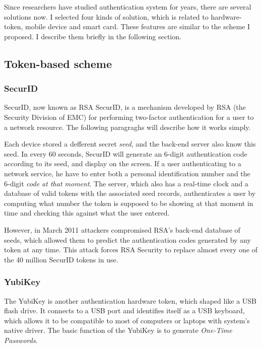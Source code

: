 \begin{CJK}{Bg5}{bsmi}
Since researchers have studied authentication system for years, there are several solutions now. I selected four kinds of solution, which is related to hardware-token, mobile device and smart card. These features are similar to the scheme I proposed. I describe them briefly in the following section.

\subsection{Token-based scheme}

\subsubsection{SecurID}

SecurID, now known as RSA SecurID\cite{rsa-securid}, is a mechanism developed by RSA (the Security Division of EMC) for performing two-factor authentication for a user to a network resource. The following paragraghs will describe how it works simply.

Each device stored a defferent secret \emph{seed}, and the back-end server also know this seed. In every 60 seconds, SecurID will generate an 6-digit authentication code according to its seed, and display on the screen. If a user authenticating to a network service, he have to enter both a personal identification number and the 6-digit \emph{code at that moment}. The server, which also has a real-time clock and a database of valid tokens with the associated seed records, authenticates a user by computing what number the token is supposed to be showing at that moment in time and checking this against what the user entered.

However, in March 2011 attackers compromised RSA's back-end database of seeds, which allowed them to predict the authentication codes generated by any token at any time. This attack forces RSA Security to replace almost every one of the 40 million SecurID tokens in use.

\subsubsection{YubiKey}

The YubiKey\cite{yubikey} is another authentication hardware token, which shaped like a USB flash drive. It connects to a USB port and identifies itself as a USB keyboard, which allows it to be compatible to most of computers or laptops with system's native driver. The basic function of the YubiKey is to generate \emph{One-Time Passwords}. 


\end{CJK}
